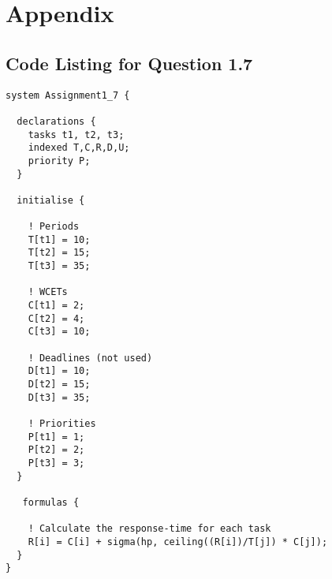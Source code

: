 \documentclass[oneside,a4paper]{article}
\begin{document}
\section{Appendix}
\subsection*{\normalsize{Code Listing for Question 1.7}}\label{Q1_7}
\begin{lstlisting}
system Assignment1_7 {

  declarations {    
    tasks t1, t2, t3;
    indexed T,C,R,D,U;
    priority P;
  }

  initialise {

    ! Periods   
    T[t1] = 10;
    T[t2] = 15;
    T[t3] = 35;
    
    ! WCETs
    C[t1] = 2;
    C[t2] = 4;
    C[t3] = 10;

    ! Deadlines (not used)
    D[t1] = 10;
    D[t2] = 15;
    D[t3] = 35;

    ! Priorities
    P[t1] = 1;
    P[t2] = 2;
    P[t3] = 3;
  }

   formulas {  

    ! Calculate the response-time for each task
    R[i] = C[i] + sigma(hp, ceiling((R[i])/T[j]) * C[j]);
  }
}
\end{lstlisting}
\pagebreak
\end{document}
